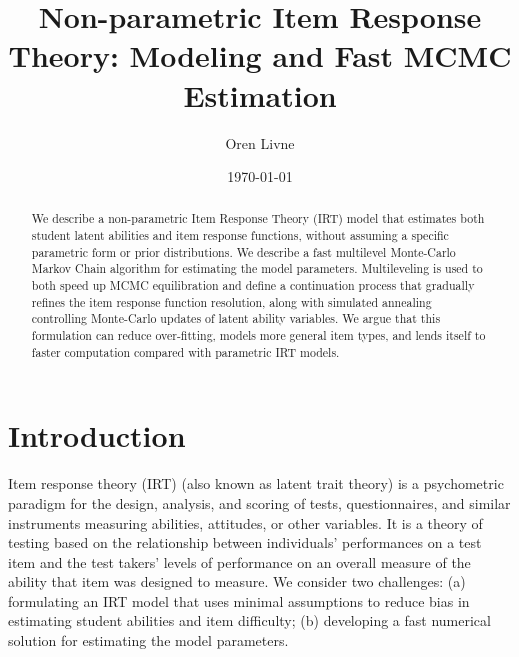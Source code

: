 \documentclass{article}
\title{Non-parametric Item Response Theory: Modeling and Fast MCMC Estimation}
\author[1]{Oren Livne}
\affil[1]{Educational Testing Service, 660 Rosedale Road, Attn: MS-12, T-197, Princeton, NJ 08540. Email: olivne@ets.org}
\date{\today}
\begin{document}
\maketitle

\begin{abstract}
We describe a non-parametric Item Response Theory (IRT) model that estimates both student latent abilities and item response functions, without assuming a specific parametric form or prior distributions. We describe a fast multilevel Monte-Carlo Markov Chain algorithm for estimating the model parameters. Multileveling is used to both speed up MCMC equilibration and define a continuation process that gradually refines the item response function resolution, along with simulated annealing controlling Monte-Carlo updates of latent ability variables. We argue that this formulation can reduce over-fitting, models more general item types, and lends itself to faster computation compared with parametric IRT models.
\end{abstract}

\section{Introduction}
Item response theory (IRT) (also known as latent trait theory) is a psychometric paradigm for the design, analysis, and scoring of tests, questionnaires, and similar instruments measuring abilities, attitudes, or other variables. It is a theory of testing based on the relationship between individuals' performances on a test item and the test takers' levels of performance on an overall measure of the ability that item was designed to measure. We consider two challenges: (a) formulating an IRT model that uses minimal assumptions to reduce bias in estimating student abilities and item difficulty; (b) developing a fast numerical solution for estimating the model parameters.
\end{document}
